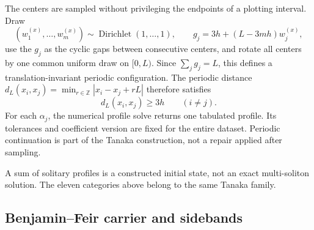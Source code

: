 \documentclass[11pt]{article}
\begin{document}
The centers are sampled without privileging the endpoints of a plotting
interval.  Draw
\begin{equation}
  (w_1^{(x)},\ldots,w_m^{(x)})
  \sim\operatorname{Dirichlet}(1,\ldots,1),
  \qquad
  g_j=3h+(L-3mh)w_j^{(x)},
  \label{eq:tanaka-cyclic-gaps}
\end{equation}
use the $g_j$ as the cyclic gaps between consecutive centers, and rotate all
centers by one common uniform draw on $[0,L)$.  Since
$\sum_jg_j=L$, this defines a translation-invariant periodic configuration.
The periodic distance
$d_L(x_i,x_j)=\min_{r\in\mathbb Z}|x_i-x_j+rL|$ therefore satisfies
\begin{equation}
  d_L(x_i,x_j)\geq3h\qquad(i\ne j).
  \label{eq:tanaka-center-separation}
\end{equation}
For each $\alpha_j$, the numerical profile solve returns one tabulated
profile.  Its tolerances and coefficient version are fixed for the entire
dataset.
Periodic continuation is part of the Tanaka construction, not a repair
applied after sampling.

A sum of solitary profiles is a constructed initial state, not an exact
multi-soliton solution.  The eleven categories above belong to the same
Tanaka family.

\subsection{Benjamin--Feir carrier and sidebands}
\end{document}
